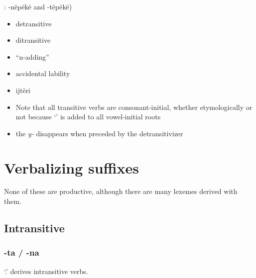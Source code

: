 \documentclass{memoir}
\begin{document}
: -nëpëkë and -tëpëkë)

\begin{itemize}
\item
  detransitive
\item
  ditransitive
\item
  ``n-adding''
\item
  accidental lability
\item
  ijtëri
\item
  Note that all transitive verbs are consonant‑initial, whether
  etymologically or not because  `' is added to all
  vowel‑initial roots
\item
  the \emph{y‑} disappears when preceded by the detransitivizer
\end{itemize}

\section{\texorpdfstring{Verbalizing suffixes
\label{sec:vbz}}{Verbalizing suffixes }}

None of these are productive, although there are many lexemes derived
with them.

\subsection{Intransitive}

\subsubsection{\texorpdfstring{-ta / -na \label{sec:tavbz}}{-ta / -na }}

 `.' derives intransitive verbs.
\end{document}
